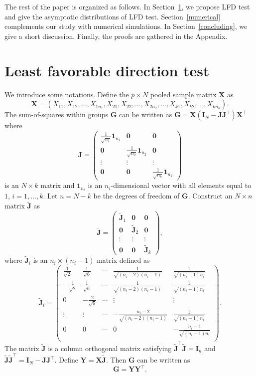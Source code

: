\documentclass[12pt]{article} %
\newcommand{\bX}{\mathbf{X}}
\newcommand{\bY}{\mathbf{Y}}
\newcommand{\bG}{\mathbf{G}}
\newcommand{\bJ}{\mathbf{J}}
\newcommand{\bI}{\mathbf{I}}
\theoremstyle{definition}
\begin{document}
    The rest of the paper is organized  as follows.
    In Section~\ref{methodology}, we propose LFD test and give
    the asymptotic distributions of LFD test.
     Section~\ref{numerical} complements our study with numerical simulations.
     In Section~\ref{concluding}, we give a short discussion.
     Finally, the proofs are gathered in the Appendix.





 
\section{Least favorable direction test}\label{methodology}
We introduce some notations.
 Define the $p\times N$ pooled sample matrix $\bX$ as
 $$\bX=(X_{11},X_{12},\ldots,X_{1n_1},X_{21},X_{22},\ldots,X_{2n_2},\ldots,X_{k1},X_{k2},\ldots,X_{kn_k}).$$
 The sum-of-squares within groups $\bG$ can be written as $\bG=\bX(\bI_N-\bJ\bJ^\top)\bX^\top$ where
 $$
 \bJ=\begin{pmatrix}
     \frac{1}{\sqrt{n_1}}\mathbf{1}_{n_1}&\mathbf{0} & \mathbf{0}\\
     \mathbf{0}&\frac{1}{\sqrt{n_2}} \mathbf{1}_{n_2}& \mathbf{0}\\
     \vdots &\vdots &\vdots \\
     \mathbf{0}&\mathbf{0}&\frac{1}{\sqrt{n_k}}\mathbf{1}_{n_k}
 \end{pmatrix}
 $$
 is an $N\times k$ matrix
 and $\mathbf{1}_{n_i}$ is an $n_i$-dimensional vector with all elements equal to $1$, $i=1,\ldots, k$.
 Let $n=N-k$ be the degrees of freedom of $\bG$.
 Construct an $N\times n$ matrix $\tilde{\bJ}$ as 
 $$
 \tilde{\bJ}=\begin{pmatrix}
     \tilde{\bJ}_1&\mathbf{0} & \mathbf{0}\\
     \mathbf{0}&\tilde{\bJ}_2& \mathbf{0}\\
     \vdots &\vdots &\vdots \\
     \mathbf{0}&\mathbf{0}&\tilde{\bJ}_k
 \end{pmatrix},
 $$
 where $\tilde{\bJ}_i$ is an $n_i\times (n_{i}-1)$ matrix defined as
 $$
\tilde{\bJ}_i=\begin{pmatrix}
    \frac{1}{\sqrt{2}}&\frac{1}{\sqrt{6}}&\cdots&\frac{1}{\sqrt{(n_i-2)(n_i-1)}}&\frac{1}{\sqrt{(n_i-1)n_i}}\\
    -\frac{1}{\sqrt{2}}&\frac{1}{\sqrt{6}}&\cdots&\frac{1}{\sqrt{(n_i-2)(n_i-1)}}&\frac{1}{\sqrt{(n_i-1)n_i}}\\
    0&-\frac{2}{\sqrt{6}}&\cdots&\vdots&\vdots\\
    \vdots&\vdots&\cdots&-\frac{n_i-2}{\sqrt{(n_i-2)(n_i-1)}}&\frac{1}{\sqrt{(n_i-1)n_i}}\\
    0&0&\cdots&0&-\frac{n_i-1}{\sqrt{(n_i-1)n_i}}\\
\end{pmatrix}.
 $$
The matrix $\tilde{\bJ}$ is a column orthogonal matrix  satisfying $\tilde{\bJ}^\top\tilde{\bJ}=\bI_{n}$ and $\tilde{\bJ}\tilde{\bJ}^\top =\bI_N-\bJ\bJ^\top$.
Define $\bY=\bX\tilde{\bJ}$.
Then $\bG$ can be written as
$$\bG=
\bY \bY^\top.
$$
\end{document}

